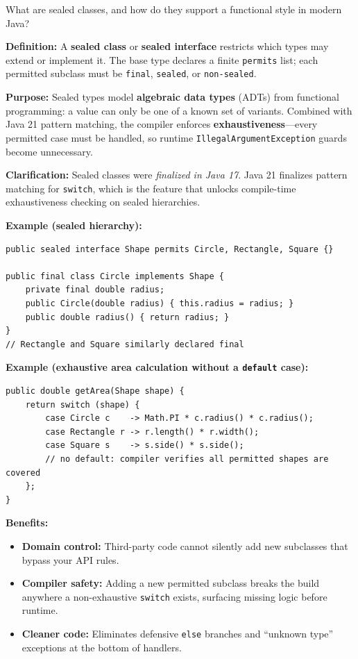 \question[6]
What are sealed classes, and how do they support a functional style in modern Java?
\begin{solutionorbox}[4.5in]
\textbf{Definition:} A \textbf{sealed class} or \textbf{sealed interface} restricts which types may extend or implement it. The base type declares a finite \lstinline[style=javainline]|permits| list; each permitted subclass must be \lstinline[style=javainline]|final|, \lstinline[style=javainline]|sealed|, or \lstinline[style=javainline]|non-sealed|.

\textbf{Purpose:} Sealed types model \textbf{algebraic data types} (ADTs) from functional programming: a value can only be one of a known set of variants. Combined with Java 21 pattern matching, the compiler enforces \textbf{exhaustiveness}---every permitted case must be handled, so runtime \lstinline[style=javainline]|IllegalArgumentException| guards become unnecessary.

\textbf{Clarification:} Sealed classes were \emph{finalized in Java 17}. Java 21 finalizes pattern matching for \lstinline[style=javainline]|switch|, which is the feature that unlocks compile-time exhaustiveness checking on sealed hierarchies.

\textbf{Example (sealed hierarchy):}
\begin{lstlisting}[style=java]
public sealed interface Shape permits Circle, Rectangle, Square {}

public final class Circle implements Shape {
    private final double radius;
    public Circle(double radius) { this.radius = radius; }
    public double radius() { return radius; }
}
// Rectangle and Square similarly declared final
\end{lstlisting}

\textbf{Example (exhaustive area calculation without a \lstinline[style=javainline]|default| case):}
\begin{lstlisting}[style=java]
public double getArea(Shape shape) {
    return switch (shape) {
        case Circle c    -> Math.PI * c.radius() * c.radius();
        case Rectangle r -> r.length() * r.width();
        case Square s    -> s.side() * s.side();
        // no default: compiler verifies all permitted shapes are covered
    };
}
\end{lstlisting}

\textbf{Benefits:}
\begin{itemize}
  \item \textbf{Domain control:} Third-party code cannot silently add new subclasses that bypass your API rules.
  \item \textbf{Compiler safety:} Adding a new permitted subclass breaks the build anywhere a non-exhaustive \lstinline[style=javainline]|switch| exists, surfacing missing logic before runtime.
  \item \textbf{Cleaner code:} Eliminates defensive \lstinline[style=javainline]|else| branches and ``unknown type'' exceptions at the bottom of handlers.
\end{itemize}
\end{solutionorbox}

